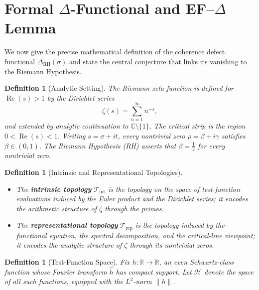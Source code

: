 \documentclass[11pt]{article}
\newtheorem{definition}[theorem]{Definition}
\theoremstyle{remark}
\DeclareMathOperator{\Rea}{Re}
\begin{document}
\section{Formal $\Delta$-Functional and EF--$\Delta$ Lemma}
\label{sec:delta-functional}

We now give the precise mathematical definition of the coherence defect
functional $\Delta_{\mathrm{RH}}(\sigma)$ and state the central conjecture
that links its vanishing to the Riemann Hypothesis.


\begin{definition}[Analytic Setting]
\label{def:analytic-setting}
The Riemann zeta function is defined for $\Rea(s)>1$ by the Dirichlet
series
\[
  \zeta(s)
  = \sum_{n=1}^{\infty} n^{-s},
\]
and extended by analytic continuation to $\mathbb{C}\setminus\{1\}$.
The \emph{critical strip} is the region $0<\Rea(s)<1$.
Writing $s = \sigma + it$, every nontrivial zero
$\rho = \beta + i\gamma$ satisfies $\beta\in(0,1)$.
The \emph{Riemann Hypothesis} (RH) asserts that $\beta = \tfrac{1}{2}$
for every nontrivial zero.
\end{definition}


\begin{definition}[Intrinsic and Representational Topologies]
\label{def:dual-topologies}
\mbox{}
\begin{itemize}
\item The \textbf{intrinsic topology} $\mathcal{T}_{\mathrm{int}}$ is the
  topology on the space of test-function evaluations induced by the
  Euler product and the Dirichlet series; it encodes the arithmetic
  structure of $\zeta$ through the primes.
\item The \textbf{representational topology} $\mathcal{T}_{\mathrm{rep}}$ is
  the topology induced by the functional equation, the spectral
  decomposition, and the critical-line viewpoint; it encodes the
  analytic structure of $\zeta$ through its nontrivial zeros.
\end{itemize}
\end{definition}


\begin{definition}[Test-Function Space]
\label{def:test-functions}
Fix $h\colon\mathbb{R}\to\mathbb{R}$, an \emph{even} Schwartz-class
function whose Fourier transform $\hat{h}$ has compact support.
Let $\mathcal{H}$ denote the space of all such functions,
equipped with the $L^{2}$-norm $\lVert h\rVert$.
\end{definition}
\end{document}
